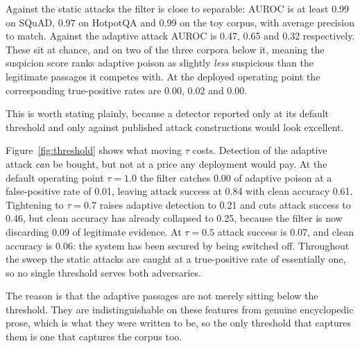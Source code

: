 \documentclass[information,article,submit,moreauthors]{Definitions/mdpi}
\newcommand{\aurocAdaptiveHotpotqa}{0.65}
\newcommand{\aurocStaticMinHotpotqa}{0.97}
\newcommand{\aurocAdaptiveToy}{0.32}
\newcommand{\aurocStaticMinToy}{0.99}
\newcommand{\aurocAdaptiveSquad}{0.47}
\newcommand{\aurocStaticMinSquad}{0.99}
\newcommand{\tprAdaptiveHotpotqa}{0.02}
\newcommand{\tprAdaptiveToy}{0.00}
\newcommand{\tprAdaptiveSquad}{0.00}
\newcommand{\tauDefault}{1.0}
\newcommand{\tauDefaultTprAdaptive}{0.00}
\newcommand{\tauDefaultAsrAdaptive}{0.84}
\newcommand{\tauDefaultCleanAcc}{0.61}
\newcommand{\tauDefaultFpr}{0.01}
\newcommand{\tauModerate}{0.7}
\newcommand{\tauModerateTprAdaptive}{0.21}
\newcommand{\tauModerateAsrAdaptive}{0.46}
\newcommand{\tauModerateCleanAcc}{0.25}
\newcommand{\tauModerateFpr}{0.09}
\newcommand{\tauAggressive}{0.5}
\newcommand{\tauAggressiveAsrAdaptive}{0.07}
\newcommand{\tauAggressiveCleanAcc}{0.06}
\begin{document}
Against the static attacks the filter is close to separable: AUROC is at least
\aurocStaticMinSquad{} on SQuAD, \aurocStaticMinHotpotqa{} on HotpotQA and
\aurocStaticMinToy{} on the toy corpus, with average precision to match. Against the adaptive
attack AUROC is \aurocAdaptiveSquad{}, \aurocAdaptiveHotpotqa{} and \aurocAdaptiveToy{}
respectively. These sit at chance, and on two of the three corpora below it, meaning the
suspicion score
ranks adaptive poison as slightly \emph{less} suspicious than the legitimate passages it
competes with. At the deployed operating point the corresponding true-positive rates are
\tprAdaptiveSquad{}, \tprAdaptiveHotpotqa{} and \tprAdaptiveToy{}.

This is worth stating plainly, because a detector reported only at its default threshold and
only against published attack constructions would look excellent.

Figure~\ref{fig:threshold} shows what moving $\tau$ costs. Detection of the adaptive attack
\emph{can} be bought, but not at a price any deployment would pay. At the default operating
point $\tau = \tauDefault{}$ the filter catches \tauDefaultTprAdaptive{} of adaptive poison at a
false-positive rate of \tauDefaultFpr{}, leaving attack success at \tauDefaultAsrAdaptive{} with
clean accuracy \tauDefaultCleanAcc{}. Tightening to $\tau = \tauModerate{}$ raises adaptive
detection to \tauModerateTprAdaptive{} and cuts attack success to \tauModerateAsrAdaptive{}, but
clean accuracy has already collapsed to \tauModerateCleanAcc{}, because the filter is now
discarding
\tauModerateFpr{} of legitimate evidence. At $\tau = \tauAggressive{}$ attack success is
\tauAggressiveAsrAdaptive{}, and clean accuracy is \tauAggressiveCleanAcc{}: the system has been
secured by being switched off. Throughout the sweep the static attacks are caught at a
true-positive rate of essentially one, so no single threshold serves both adversaries.

The reason is that the adaptive passages are not merely sitting below the threshold. They are
indistinguishable on these features from genuine encyclopedic prose, which is what they were
written to be, so the only threshold that captures them is one that captures the corpus too.
\end{document}
